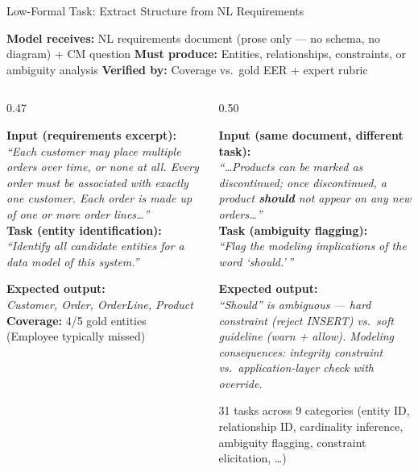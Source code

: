 \documentclass[aspectratio=169]{beamer}
\begin{document}
\begin{frame}{Low-Formal Task: Extract Structure from NL Requirements}

{\small
\textbf{Model receives:} NL requirements document (prose only --- no schema, no diagram) + CM question \quad
\textbf{Must produce:} Entities, relationships, constraints, or ambiguity analysis \quad
\textbf{Verified by:} Coverage vs.\ gold EER + expert rubric}

\vspace{0.3em}
\begin{columns}[T]
\begin{column}{0.47\textwidth}
\colorbox{lowformal!8}{\parbox{0.95\linewidth}{\footnotesize
\textbf{Input (requirements excerpt):}\\[0.2em]
\textit{``Each customer may place multiple orders over time, or none at all. Every order must be associated with exactly one customer. Each order is made up of one or more order lines\ldots''}\\[0.4em]
\textbf{Task (entity identification):}\\[0.2em]
\textit{``Identify all candidate entities for a data model of this system.''}
}}

\vspace{0.2em}
\colorbox{lowformal!8}{\parbox{0.95\linewidth}{\footnotesize
\textbf{Expected output:}\\[0.2em]
\textit{Customer, Order, OrderLine, Product}\\[0.1em]
\textbf{Coverage:} 4/5 gold entities (Employee typically missed)
}}
\end{column}

\begin{column}{0.50\textwidth}
\colorbox{lowformal!8}{\parbox{0.95\linewidth}{\footnotesize
\textbf{Input (same document, different task):}\\[0.2em]
\textit{``\ldots Products can be marked as discontinued; once discontinued, a product \textbf{should} not appear on any new orders\ldots''}\\[0.4em]
\textbf{Task (ambiguity flagging):}\\[0.2em]
\textit{``Flag the modeling implications of the word `should.'\,''}
}}

\vspace{0.2em}
\colorbox{lowformal!8}{\parbox{0.95\linewidth}{\footnotesize
\textbf{Expected output:}\\[0.2em]
\textit{``Should'' is ambiguous --- hard constraint (reject INSERT) vs.\ soft guideline (warn + allow). Modeling consequences: integrity constraint vs.\ application-layer check with override.}
}}

\vspace{0.3em}
{\footnotesize 31 tasks across 9 categories (entity ID, relationship ID, cardinality inference, ambiguity flagging, constraint elicitation, \ldots)}
\end{column}
\end{columns}

\end{frame}
\end{document}
